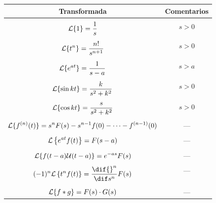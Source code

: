 \documentclass[../main.tex]{subfiles}
\begin{document}
\begin{figure}[ht]
  \centering
  \begin{tabular}{c|c}
    Transformada & Comentarios
    \\[0.7em] \hline \\[-1.0em]
    \(\displaystyle \mathcal{L}\{1\} = \frac{1}{s}\) & \(s>0\)
    \\[0.7em] \hline \\[-1.0em]
    \(\displaystyle \mathcal{L}\{t^n\} = \frac{n!}{s^{n+1}}\) & \(s>0\)
    \\[0.7em] \hline \\[-1.0em]
    \(\displaystyle \mathcal{L}\{e^{at}\} = \frac{1}{s-a}\) & \(s>a\)
    \\[0.7em] \hline \\[-1.0em]
    \(\displaystyle \mathcal{L}\{\sin kt\} = \frac{k}{s^2+k^2}\) & \(s>0\)
    \\[0.7em] \hline \\[-1.0em]
    \(\displaystyle \mathcal{L}\{\cos kt\} = \frac{s}{s^2+k^2}\) & \(s>0\)
    \\[0.7em] \hline \\[-1.0em]
    \(\displaystyle \mathcal{L}\{f^{(n)}(t)\} = s^nF(s) - s^{n-1}f(0) - \cdots -
    f^{(n-1)}(0)\) & ---
    \\[0.4em] \hline \\[-1.0em]
    \(\displaystyle \mathcal{L}\left\{e^{at}f(t)\right\} = F(s-a)\) & ---
    \\[0.4em] \hline \\[-1.0em]
    \(\displaystyle \mathcal{L}\{f(t-a)\mathcal{U}(t-a)\} = e^{-as}F(s)\) & ---
    \\[0.4em] \hline \\[-1.0em]
    \(\displaystyle (-1)^n\L\left\{t^nf(t)\right\} = \frac{\dif {}^n}{\dif s^n}
    F(s)\) & ---
    \\[0.7em] \hline \\[-1.0em]
    \(\displaystyle \mathcal{L}\{f \ast g\} = F(s) \cdot G(s)\) & ---
  \end{tabular}
\end{figure}
\end{document}
